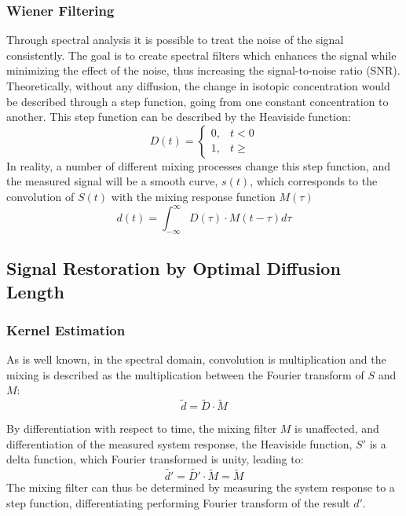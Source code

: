 \documentclass[../../CompleteThesis/Complete_1stDraft]{subfiles}
\begin{document}
\subsubsection[Wiener Filtering][Wiener Filtering]{Wiener Filtering}
Through spectral analysis it is possible to treat the noise of the signal consistently. The goal is to create spectral filters which enhances the signal while minimizing the effect of the noise, thus increasing the signal-to-noise ratio (SNR).\\
Theoretically, without any diffusion, the change in isotopic concentration would be described through a step function, going from one constant concentration to another. This step function can be described by the Heaviside function:
\begin{equation}
	D(t) = \begin{cases}
		0, & t < 0 \\
		1, & t \geq
	\end{cases}
\end{equation}
In reality, a number of different mixing processes change this step function, and the measured signal will be a smooth curve, $s(t)$, which corresponds to the convolution of $S(t)$ with the mixing response function $M(\tau)$
\begin{equation}
	d(t) = \int_{- \infty}^{\infty} D(\tau) \cdot M(t - \tau)d\tau
\end{equation}


\subsection[Signal Restoration][Signal Restoration]{Signal Restoration by Optimal Diffusion Length}
\subsubsection{Kernel Estimation}
As is well known, in the spectral domain, convolution is multiplication and the mixing is described as the multiplication between the Fourier transform of $S$ and $M$:
\begin{equation}
	\tilde{d} = \tilde{D} \cdot \tilde{M}
\end{equation}


By differentiation with respect to time, the mixing filter $M$ is unaffected, and differentiation of the measured system response, the Heaviside function, $S'$ is a delta function, which Fourier transformed is unity, leading to:
\begin{equation}
	\tilde{d'} = \tilde{D'} \cdot \tilde{M} = \tilde{M}
\end{equation}
The mixing filter can thus be determined by measuring the system response to a step function, differentiating performing Fourier transform of the result $d'$.
\end{document}
